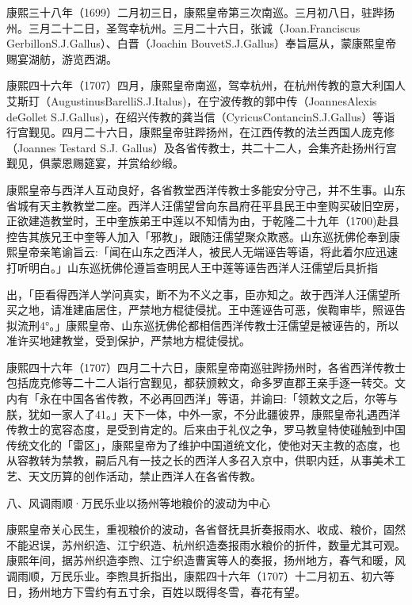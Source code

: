康熙三十八年（1699）二月初三日，康熙皇帝第三次南巡。三月初八日，驻跸扬州。三月二十二日，圣驾幸杭州。三月二十六日，张诚（Joan.Franciscus GerbillonS.J.Gallus）、白晋（Joachin BouvetS.J.Gallus）奉旨扈从，蒙康熙皇帝赐宴湖舫，游览西湖。

康熙四十六年（1707）四月，康熙皇帝南巡，驾幸杭州，在杭州传教的意大利国人艾斯玎（AugustinusBarelliS.J.Italus)，在宁波传教的郭中传（JoannesAlexis deGollet S.J.Gallus)，在绍兴传教的龚当信（CyricusContancinS.J.Gallus）等诣行宫觐见。四月二十六日，康熙皇帝驻跸扬州，在江西传教的法兰西国人庞克修（Joannes Testard S.J. Gallus）及各省传教士，共二十二人，会集齐赴扬州行宫觐见，俱蒙恩赐筵宴，并赏给纱缎。

康熙皇帝与西洋人互动良好，各省教堂西洋传教士多能安分守己，并不生事。山东省城有天主教教堂二座。西洋人汪儒望曾向东昌府茌平县民王中奎购买破旧空房，正欲建造教堂时，王中奎族弟王中莲以不知情为由，于乾隆二十九年（1700)赴县控告其族兄王中奎等人加入「邪教」，跟随汪儒望聚众欺惑。山东巡抚佛伦奉到康熙皇帝亲笔谕旨云:「闻在山东之西洋人，被民人无端诬告等语，将此着尔应迅速打听明白。」山东巡抚佛伦遵旨查明民人王中莲等诬告西洋人汪儒望后具折指

\vfill
\begin{BookNotes}
\end{BookNotes}

\noindent 出，「臣看得西洋人学问真实，断不为不义之事，臣亦知之。故于西洋人汪儒望所买之地，请准建庙居住，严禁地方棍徒侵扰。王中莲诬告可恶，俟鞫审毕，照诬告拟流刑4°。」康熙皇帝、山东巡抚佛伦都相信西洋传教士汪儒望是被诬告的，所以准许买地建教堂，受到保护，严禁地方棍徒侵扰。

康熙四十六年（1707）四月二十六日，康熙皇帝南巡驻跸扬州时，各省西洋传教士包括庞克修等二十二人诣行宫觐见，都获颁敕文，命多罗直郡王亲手逐一转交。文内有「永在中国各省传教，不必再回西洋」等语，并谕曰:「领敕文之后，尔等与朕，犹如一家人了41。」天下一体，中外一家，不分此疆彼界，康熙皇帝礼遇西洋传教士的宽容态度，是受到肯定的。后来由于礼仪之争，罗马教皇特使碰触到中国传统文化的「雷区」，康熙皇帝为了维护中国道统文化，使他对天主教的态度，也从容教转为禁教，嗣后凡有一技之长的西洋人多召入京中，供职内廷，从事美术工艺、天文历算的创作活动，禁止西洋人在各省传教。

八、风调雨顺·万民乐业以扬州等地粮价的波动为中心

康熙皇帝关心民生，重视粮价的波动，各省督抚具折奏报雨水、收成、粮价，固然不能迟误，苏州织造、江宁织造、杭州织造奏报雨水粮价的折件，数量尤其可观。康熙年间，据苏州织造李煦、江宁织造曹寅等人的奏报，扬州地方，春气和暖，风调雨顺，万民乐业。李煦具折指出，康熙四十六年（1707）十二月初五、初六等日，扬州地方下雪约有五寸余，百姓以既得冬雪，春花有望。

